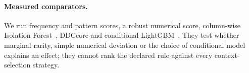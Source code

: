 \paragraph{Measured comparators.}
We run frequency and pattern scores, a robust numerical score, column-wise
Isolation Forest~\cite{liu2008isolation}, DDCcore and conditional
LightGBM~\cite{ke2017lightgbm}. They test whether marginal rarity, simple numerical
deviation or the choice of conditional model explains an effect; they cannot rank
the declared rule against every context-selection strategy.
